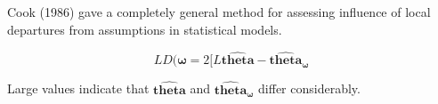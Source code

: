 

Cook (1986) gave a completely general method for assessing influence of local departures from
assumptions in statistical models.


\[  LD(\boldsymbol{\omega}= 2[ L\boldsymbol{\hat{theta}} - \boldsymbol{\hat{theta}_\omega} \]

Large values indicate that $\boldsymbol{\hat{theta}}$ and $\boldsymbol{\hat{theta}_\omega}$ differ considerably.

  
